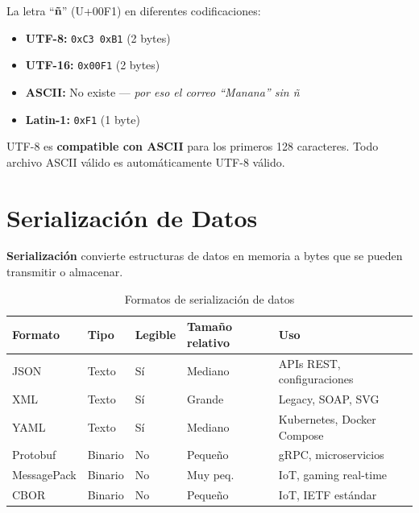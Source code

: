 \begin{ejemplo}
La letra ``\textbf{ñ}'' (U+00F1) en diferentes codificaciones:
\begin{itemize}
    \item \textbf{UTF-8:} \texttt{0xC3 0xB1} (2 bytes)
    \item \textbf{UTF-16:} \texttt{0x00F1} (2 bytes)
    \item \textbf{ASCII:} No existe --- \textit{por eso el correo ``Manana'' sin ñ}
    \item \textbf{Latin-1:} \texttt{0xF1} (1 byte)
\end{itemize}
UTF-8 es \textbf{compatible con ASCII} para los primeros 128 caracteres.
Todo archivo ASCII válido es automáticamente UTF-8 válido.
\end{ejemplo}

\section{ Serialización de Datos}

\begin{concepto}
\textbf{Serialización} convierte estructuras de datos en memoria a bytes
que se pueden transmitir o almacenar.
\end{concepto}

\begin{table}[h!]
\centering
\renewcommand{\arraystretch}{1.4}
\begin{tabular}{lllll}
\toprule
\textbf{Formato} & \textbf{Tipo} & \textbf{Legible} & \textbf{Tamaño relativo} & \textbf{Uso} \\
\midrule
JSON        & Texto   & Sí  & Mediano   & APIs REST, configuraciones \\
XML         & Texto   & Sí  & Grande    & Legacy, SOAP, SVG \\
YAML        & Texto   & Sí  & Mediano   & Kubernetes, Docker Compose \\
Protobuf    & Binario & No  & Pequeño   & gRPC, microservicios \\
MessagePack & Binario & No  & Muy peq.  & IoT, gaming real-time \\
CBOR        & Binario & No  & Pequeño   & IoT, IETF estándar \\
\bottomrule
\end{tabular}
\caption{Formatos de serialización de datos}
\end{table}


